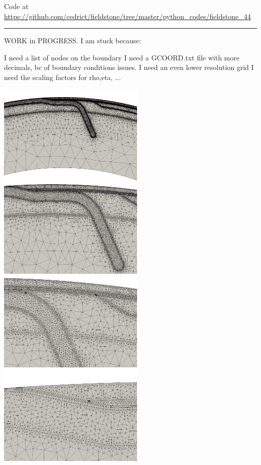 

\begin{center}
Code at \url{https://github.com/cedrict/fieldstone/tree/master/python_codes/fieldstone_44}
\end{center}

\par\noindent\rule{\textwidth}{0.4pt}

WORK in PROGRESS. I am stuck because:

I need a list of nodes on the boundary
I need a GCOORD.txt file with more decimals, bc of boundary conditions issues.
I need an even lower resolution  grid
I need the scaling factors for rho,eta, ...


\begin{center}
\includegraphics[width=7cm]{python_codes/fieldstone_44/grid_lowres2}
\includegraphics[width=7cm]{python_codes/fieldstone_44/grid_lowres3}\\
\includegraphics[width=7cm]{python_codes/fieldstone_44/grid_lowres4}
\includegraphics[width=7cm]{python_codes/fieldstone_44/grid_lowres5}
\end{center}

